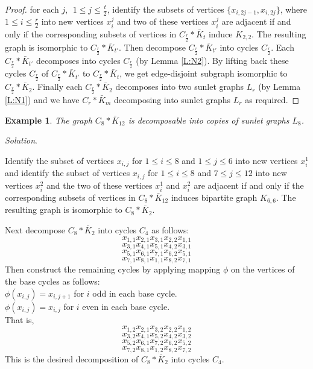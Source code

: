 \documentclass[12pt]{report}
\newtheorem{exm}[thm]{Example}
\begin{document}
\begin{proof}
 for each $j,\ \ 1\leq j\leq \frac{t}{2}$, identify the subsets of vertices $\{x_{i,2j-1},x_{i,2j}\}$, where $1\leq i\leq \frac{r}{2}$ into new vertices $x_i^j$ and two of these vertices $x_i^j$ are adjacent if and only if the corresponding subsets of vertices in $C_{\frac{r}{2}}*\bar{K}_t$ induce $K_{2,2}$. The resulting graph is isomorphic to $C_{\frac{r}{2}}*\bar{K}_{t'}$. Then decompose $C_{\frac{r}{2}}*\bar{K}_{t'}$ into  cycles $C_{\frac{r}{2}}$. Each  $C_{\frac{r}{2}}*\bar{K}_{t'}$ decomposes into cycles $C_{\frac{r}{2}}$ (by Lemma \ref{L:N2}). By lifting back these cycles $C_{\frac{r}{2}}$ of $C_{\frac{r}{2}}*\bar{K}_{t'}$ to $C_{\frac{r}{2}}*\bar{K}_t$, we get edge-disjoint subgraph isomorphic to $C_{\frac{r}{2}}*\bar{K}_2$. Finally each $C_{\frac{r}{2}}*\bar{K}_2$ decomposes  into two sunlet graphs $L_r$ (by Lemma \ref{L:N1}) and we have $C_r*\bar{K}_m$ decomposing into sunlet graphs $L_r$ as required.
 \end{proof}
 \begin{exm}\label{E:R1}
 The graph $C_8*\bar{K}_{12}$ is decomposable into copies of sunlet
 graphs $L_8$.
 \end{exm}
{\em Solution}.

 Identify the subset of vertices $x_{i,j}$ for $1\leq i\leq 8$ and
 $1\leq j\leq 6$ into new vertices $x_i^1$ and identify the subset
 of vertices $x_{i,j}$ for $1\leq i\leq 8$ and $7\leq j\leq 12$ into
 new vertices $x_i^2$ and the two of these vertices $x_i^1$ and
 $x_i^2$ are adjacent if and only if the corresponding subsets of
 vertices in $C_8*\bar{K}_{12}$ induces bipartite graph $K_{6,6}$.
 The resulting graph is isomorphic to $C_8*\bar{K}_2$.

 Next decompose $C_8*\bar{K}_2$ into cycles $C_4$ as follows:
 $$x_{1,1}x_{2,1}x_{3,1}x_{2,2}x_{1,1}$$
 $$x_{3,1}x_{4,1}x_{5,1}x_{4,2}x_{3,1}$$
 $$x_{5,1}x_{6,1}x_{7,1}x_{6,2}x_{5,1}$$
 $$x_{7,1}x_{8,1}x_{1,1}x_{8,2}x_{7,1}$$
 Then construct the remaining cycles by applying mapping $\phi$ on
 the vertices of the base cycles as follows:\\
$\phi(x_{i,j})=x_{i,j+1}$ for $i$ odd in each base cycle.\\
$\phi(x_{i,j})=x_{i,j}$ for $i$ even in each base cycle.\\
That is,
$$x_{1,2}x_{2,1}x_{3,2}x_{2,2}x_{1,2}$$
$$x_{3,2}x_{4,1}x_{5,2}x_{4,2}x_{3,2}$$
$$x_{5,2}x_{6,1}x_{7,2}x_{6,2}x_{5,2}$$
$$x_{7,2}x_{8,1}x_{1,2}x_{8,2}x_{7,2}$$
This is the desired decomposition of $C_8*\bar{K}_2$ into cycles
$C_4$.
\end{document}
